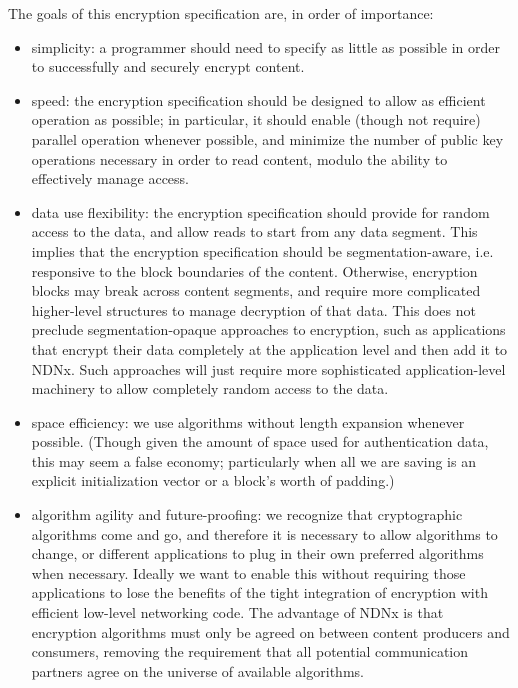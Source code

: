 The goals of this encryption specification are, in order of importance:
\begin{itemize}
\item simplicity: a programmer should need to specify as little as possible in order to successfully and securely encrypt content.
\item speed: the encryption specification should be designed to allow
  as efficient operation as possible; in particular, it should enable
  (though not require) parallel operation whenever possible, and
  minimize the number of public key operations necessary in order to
  read content, modulo the ability to effectively manage access.
\item data use flexibility: the encryption specification should
  provide for random access to the data, and allow reads to start from
  any data segment. This implies that the encryption specification
  should be segmentation-aware, i.e. responsive to the block
  boundaries of the content. Otherwise, encryption blocks may break
  across content segments, and require more complicated higher-level
  structures to manage decryption of that data. This does not preclude
  segmentation-opaque approaches to encryption, such as applications
  that encrypt their data completely at the application level and then
  add it to NDNx. Such approaches will just require more sophisticated
  application-level machinery to allow completely random access to the
  data.
\item space efficiency: we use algorithms without length expansion
  whenever possible. (Though given the amount of space used for
  authentication data, this may seem a false economy; particularly
  when all we are saving is an explicit initialization vector or a
  block's worth of padding.)
\item algorithm agility and future-proofing: we recognize that
  cryptographic algorithms come and go, and therefore it is necessary
  to allow algorithms to change, or different applications to plug in
  their own preferred algorithms when necessary. Ideally we want to
  enable this without requiring those applications to lose the
  benefits of the tight integration of encryption with efficient
  low-level networking code. The advantage of NDNx is that encryption
  algorithms must only be agreed on between content producers and
  consumers, removing the requirement that all potential communication
  partners agree on the universe of available algorithms.
\end{itemize}

